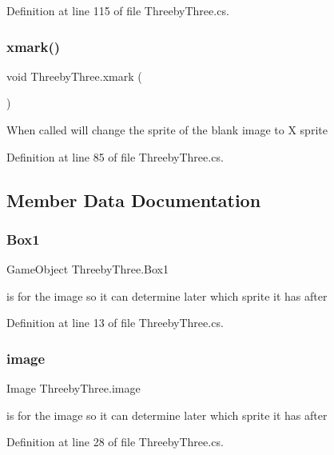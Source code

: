 Definition at line 115 of file Threeby\+Three.\+cs.

\mbox{\label{class_threeby_three_a876c699e7a88fc53db669a7faed55716}} 
\subsubsection{\texorpdfstring{xmark()}{xmark()}}
{\footnotesize\ttfamily void Threeby\+Three.\+xmark (\begin{DoxyParamCaption}{ }\end{DoxyParamCaption})}

When called will change the sprite of the blank image to X sprite 

Definition at line 85 of file Threeby\+Three.\+cs.



\subsection{Member Data Documentation}
\mbox{\label{class_threeby_three_a64f0787e39600142dccb43aef0f35ce5}} 
\subsubsection{\texorpdfstring{Box1}{Box1}}
{\footnotesize\ttfamily Game\+Object Threeby\+Three.\+Box1}

is for the image so it can determine later which sprite it has after 

Definition at line 13 of file Threeby\+Three.\+cs.

\mbox{\label{class_threeby_three_a883ff6e0de42a1c328f5e944c05b7563}} 
\subsubsection{\texorpdfstring{image}{image}}
{\footnotesize\ttfamily Image Threeby\+Three.\+image}

is for the image so it can determine later which sprite it has after 

Definition at line 28 of file Threeby\+Three.\+cs.

